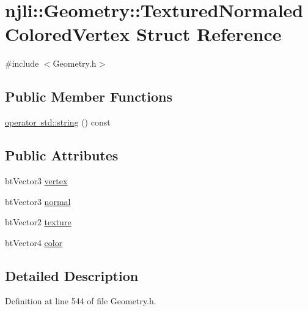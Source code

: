 \hypertarget{structnjli_1_1_geometry_1_1_textured_normaled_colored_vertex}{}\section{njli\+:\+:Geometry\+:\+:Textured\+Normaled\+Colored\+Vertex Struct Reference}
\label{structnjli_1_1_geometry_1_1_textured_normaled_colored_vertex}


{\ttfamily \#include $<$Geometry.\+h$>$}

\subsection*{Public Member Functions}
\begin{DoxyCompactItemize}
\item 
\mbox{\hyperlink{structnjli_1_1_geometry_1_1_textured_normaled_colored_vertex_a2da687ece7a0358e65dd8fbe00551127}{operator std\+::string}} () const
\end{DoxyCompactItemize}
\subsection*{Public Attributes}
\begin{DoxyCompactItemize}
\item 
bt\+Vector3 \mbox{\hyperlink{structnjli_1_1_geometry_1_1_textured_normaled_colored_vertex_ae6a6ce74752e418ca7ae6fd3511c4515}{vertex}}
\item 
bt\+Vector3 \mbox{\hyperlink{structnjli_1_1_geometry_1_1_textured_normaled_colored_vertex_af51b64c482f53d1b668dead055e37bcd}{normal}}
\item 
bt\+Vector2 \mbox{\hyperlink{structnjli_1_1_geometry_1_1_textured_normaled_colored_vertex_a10525c570e5870adc1eff1e07a9cda0b}{texture}}
\item 
bt\+Vector4 \mbox{\hyperlink{structnjli_1_1_geometry_1_1_textured_normaled_colored_vertex_aed1b3ebbaf3b59beb3a04d40e977bb15}{color}}
\end{DoxyCompactItemize}


\subsection{Detailed Description}


Definition at line 544 of file Geometry.\+h.



